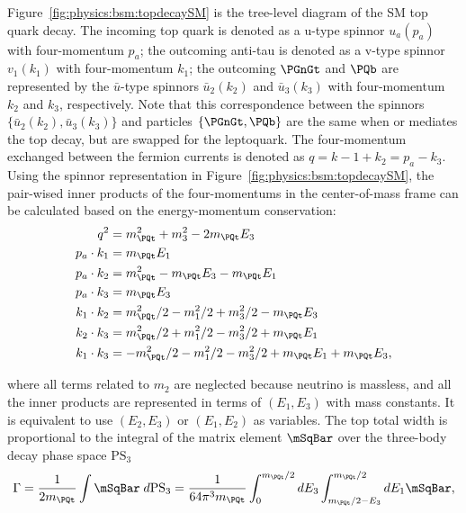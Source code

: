 Figure~\ref{fig:physics:bsm:topdecaySM} is the tree-level diagram of the SM top quark decay. The incoming top quark is denoted as a u-type spinnor $u_a(p_a)$ with four-momentum $p_a$; the outcoming anti-tau is denoted as a v-type spinnor $v_1(k_1)$ with four-momentum $k_1$; the outcoming  $\PGnGt$ and $\PQb$ are represented by the $\bar{u}$-type spinnors $\bar{u}_2(k_2)$ and $\bar{u}_3(k_3)$ with four-momentum $k_2$ and $k_3$, respectively. Note that this correspondence between the spinnors $\{ \bar{u}_2(k_2), \bar{u}_3(k_3)\}$ and particles $\{\PGnGt, \PQb\}$ are the same when \PWpr or \PSHp mediates the top decay, but are swapped for the leptoquark. The four-momentum exchanged between the fermion currents is denoted as $q=k-1+k_2 = p_a - k_3$. Using the spinnor representation in Figure~\ref{fig:physics:bsm:topdecaySM}, the pair-wised inner products of the four-momentums in the center-of-mass frame can be calculated based on the energy-momentum conservation:
\begin{equation}
\begin{split}
	q^2 &=  m_\PQt^2 + m_3^2  -2 m_\PQt E_3  \\
    p_a \cdot k_1 &= m_\PQt E_1 \\
    p_a \cdot k_2 &= m_\PQt^2  -m_\PQt E_3-m_\PQt E_1  \\
    p_a \cdot k_3 &= m_\PQt E_3 \\
    k_1 \cdot k_2 &= m_\PQt^2/2 - m_1^2/2 + m_3^2/2 - m_\PQt E_3 \\
    k_2\cdot k_3 &=  m_\PQt^2/2 + m_1^2/2 - m_3^2/2 + m_\PQt E_1 \\
    k_1\cdot k_3 &=   -m_\PQt^2/2 - m_1^2/2 - m_3^2/2 + m_\PQt E_1 + m_\PQt E_3 ,
\end{split}
\label{eqn:physics:bsm:innerProduct}
\end{equation}

\noindent where all terms related to $m_2$ are neglected because neutrino is massless, and all the inner products are represented in terms of $ ( E_1,E_3 )$ with mass constants. It is equivalent to use $ ( E_2,E_3 )$ or $ ( E_1,E_2 )$ as variables. The top total width is proportional to the integral of the matrix element $\mSqBar $ over the three-body decay phase space $\mathrm{PS_3}$
\begin{equation}
	\Gamma = \frac{1}{2 m_\PQt} \int \mSqBar \; d\mathrm{PS_3} = \frac{1}{64 \pi^3 m_\PQt} \int_{0}^{m_\PQt/2} dE_3 \int_{m_\PQt/2-E_3}^{m_\PQt/2} dE_1 \mSqBar ,
    \label{eqn:physics:bsm:decayWidth}
\end{equation}




